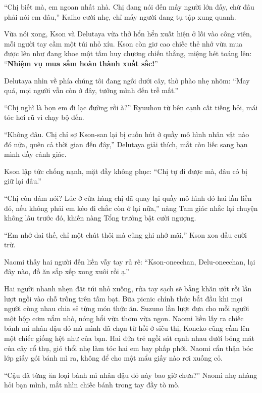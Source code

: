 ﻿\documentclass[../main.tex]{subfiles}
\begin{document}
``Chị biết mà, em ngoan nhất nhà. Chị đang nói đến mấy người lớn đấy, chứ đâu phải nói em đâu,'' Kaiho cười nhẹ, chỉ mấy người đang tụ tập xung quanh.


Vừa nói xong, Kson và Delutaya vừa thở hổn hển xuất hiện ở lối vào công viên, mỗi người tay cầm một túi nhỏ xíu. Kson còn giơ cao chiếc thẻ nhớ vừa mua được lên như đang khoe một tấm huy chương chiến thắng, miệng hét toáng lên: ``\textbf{Nhiệm vụ mua sắm hoàn thành xuất sắc!}''

Delutaya nhìn về phía chúng tôi đang ngồi dưới cây, thở phào nhẹ nhõm: ``May quá, mọi người vẫn còn ở đây, tưởng mình đến trễ mất.''

``Chị nghĩ là bọn em đi lạc đường rồi à?'' Ryuuhou từ bên cạnh cất tiếng hỏi, mái tóc hơi rũ vì chạy bộ đến.

``Không đâu. Chị chỉ sợ Kson-san lại bị cuốn hút ở quầy mô hình nhân vật nào đó nữa, quên cả thời gian đến đây,'' Delutaya giải thích, mắt còn liếc sang bạn mình đầy cảnh giác.

Kson lập tức chống nạnh, mặt đầy không phục: ``Chị tự đi được mà, đâu có bị giữ lại đâu.''

``Chị còn dám nói? Lúc ở cửa hàng chị đã quay lại quầy mô hình đó hai lần liền đó, nếu không phải em kéo đi chắc còn ở lại nữa,'' nàng Tam giác nhắc lại chuyện không lâu trước đó, khiến nàng Tổng trưởng bật cười ngượng.

``Em nhớ dai thế, chỉ một chút thôi mà cũng ghi nhớ mãi,'' Kson xoa đầu cười trừ.

Naomi thấy hai người đến liền vẫy tay rủ rê: ``Kson-oneechan, Delu-oneechan, lại đây nào, đồ ăn sắp xếp xong xuôi rồi ạ.''

Hai người nhanh nhẹn đặt túi nhỏ xuống, rửa tay sạch sẽ bằng khăn ướt rồi lần lượt ngồi vào chỗ trống trên tấm bạt. Bữa picnic chính thức bắt đầu khi mọi người cùng nhau chia sẻ từng món thức ăn. Suzuno lần lượt đưa cho mỗi người một hộp cơm nắm nhỏ, nóng hổi vừa thơm vừa ngon. Naomi liền lấy ra chiếc bánh mì nhân đậu đỏ mà mình đã chọn từ hồi ở siêu thị, Koneko cũng cầm lên một chiếc giống hệt như của bạn. Hai đứa trẻ ngồi sát cạnh nhau dưới bóng mát của cây cổ thụ, gió thổi nhẹ làm tóc hai em bay phấp phới. Naomi cẩn thận bóc lớp giấy gói bánh mì ra, không để cho một mẩu giấy nào rơi xuống cỏ.

``Cậu đã từng ăn loại bánh mì nhân đậu đỏ này bao giờ chưa?'' Naomi nhẹ nhàng hỏi bạn mình, mắt nhìn chiếc bánh trong tay đầy tò mò.
\end{document}
